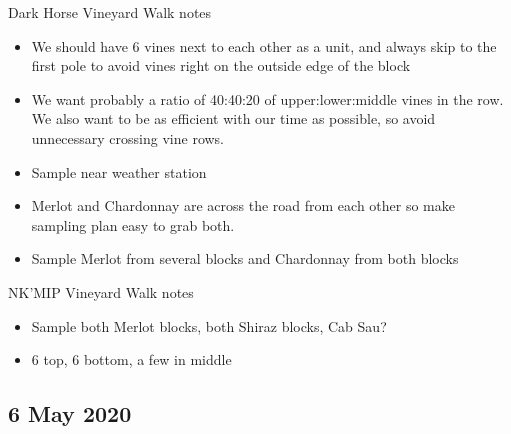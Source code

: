 \documentclass[11pt,letter]{article}
\newenvironment{smitemize}{
\begin{itemize}
  \setlength{\itemsep}{0pt}
  \setlength{\parskip}{0.8pt}
  \setlength{\parsep}{0pt}}
{\end{itemize}
}
\begin{document}
Dark Horse Vineyard Walk notes
\begin{smitemize}
\item We should have 6 vines next to each other as a unit, and always skip to the first pole to avoid vines right on the outside edge of the block
\item We want probably a ratio of 40:40:20 of upper:lower:middle vines in the row. We also want to be as efficient with our time as possible, so avoid unnecessary crossing vine rows.
\item Sample near weather station
\item Merlot and Chardonnay are across the road from each other so make sampling plan easy to grab both.
\item Sample Merlot from several blocks and Chardonnay from both blocks

\end{smitemize}

NK'MIP Vineyard Walk notes
\begin{smitemize}
\item Sample both Merlot blocks, both Shiraz blocks, Cab Sau?
\item 6 top, 6 bottom, a few in middle

\end{smitemize}


\subsection{6 May 2020}
\end{document}
